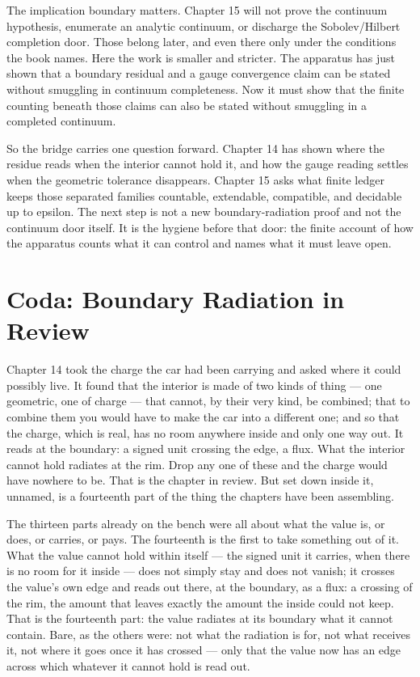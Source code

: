 The implication boundary matters. Chapter 15 will not prove the continuum
hypothesis, enumerate an analytic continuum, or discharge the Sobolev/Hilbert
completion door. Those belong later, and even there only under the conditions
the book names. Here the work is smaller and stricter. The apparatus has just
shown that a boundary residual and a gauge convergence claim can be stated
without smuggling in continuum completeness. Now it must show that the finite
counting beneath those claims can also be stated without smuggling in a
completed continuum.

So the bridge carries one question forward. Chapter 14 has shown where the
residue reads when the interior cannot hold it, and how the gauge reading
settles when the geometric tolerance disappears. Chapter 15 asks what finite
ledger keeps those separated families countable, extendable, compatible, and
decidable up to epsilon. The next step is not a new boundary-radiation proof and
not the continuum door itself. It is the hygiene before that door: the finite
account of how the apparatus counts what it can control and names what it must
leave open.

\section*{Coda: Boundary Radiation in Review}

Chapter 14 took the charge the car had been carrying and asked where it could possibly live. It found that the interior is made of two kinds of thing --- one geometric, one of charge --- that cannot, by their very kind, be combined; that to combine them you would have to make the car into a different one; and so that the charge, which is real, has no room anywhere inside and only one way out. It reads at the boundary: a signed unit crossing the edge, a flux. What the interior cannot hold radiates at the rim. Drop any one of these and the charge would have nowhere to be. That is the chapter in review. But set down inside it, unnamed, is a fourteenth part of the thing the chapters have been assembling.

The thirteen parts already on the bench were all about what the value is, or does, or carries, or pays. The fourteenth is the first to take something out of it. What the value cannot hold within itself --- the signed unit it carries, when there is no room for it inside --- does not simply stay and does not vanish; it crosses the value's own edge and reads out there, at the boundary, as a flux: a crossing of the rim, the amount that leaves exactly the amount the inside could not keep. That is the fourteenth part: the value radiates at its boundary what it cannot contain. Bare, as the others were: not what the radiation is for, not what receives it, not where it goes once it has crossed --- only that the value now has an edge across which whatever it cannot hold is read out.

